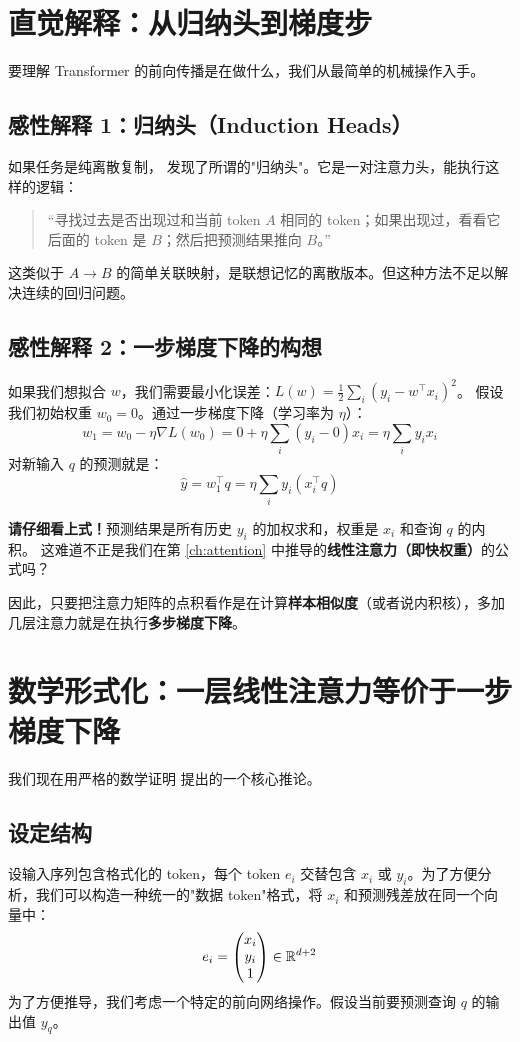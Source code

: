 \section{直觉解释：从归纳头到梯度步}
\label{sec:icl_intuition}

要理解 Transformer 的前向传播是在做什么，我们从最简单的机械操作入手。

\subsection{感性解释 1：归纳头（Induction Heads）}
如果任务是纯离散复制，\citet{olsson2022context} 发现了所谓的"归纳头"。它是一对注意力头，能执行这样的逻辑：
\begin{quote}
``寻找过去是否出现过和当前 token $A$ 相同的 token；如果出现过，看看它后面的 token 是 $B$；然后把预测结果推向 $B$。''
\end{quote}
这类似于 $A \to B$ 的简单关联映射，是联想记忆的离散版本。但这种方法不足以解决连续的回归问题。

\subsection{感性解释 2：一步梯度下降的构想}
如果我们想拟合 $w$，我们需要最小化误差：$L(w) = \frac{1}{2}\sum_i (y_i - w^\top x_i)^2$。
假设我们初始权重 $w_0 = 0$。通过一步梯度下降（学习率为 $\eta$）：
\[
  w_1 = w_0 - \eta \nabla L(w_0) = 0 + \eta \sum_i (y_i - 0) x_i = \eta \sum_i y_i x_i
\]
对新输入 $q$ 的预测就是：
\[
  \hat{y} = w_1^\top q = \eta \sum_i y_i (x_i^\top q)
\]

\textbf{请仔细看上式！}预测结果是所有历史 $y_i$ 的加权求和，权重是 $x_i$ 和查询 $q$ 的内积。
这难道不正是我们在第 \ref{ch:attention} 中推导的\textbf{线性注意力（即快权重）}的公式吗？

因此，只要把注意力矩阵的点积看作是在计算\textbf{样本相似度}（或者说内积核），多加几层注意力就是在执行\textbf{多步梯度下降}。

\section{数学形式化：一层线性注意力等价于一步梯度下降}
\label{sec:icl_math}

我们现在用严格的数学证明 \citet{von2022transformers} 提出的一个核心推论。

\subsection*{设定结构}
设输入序列包含格式化的 token，每个 token $e_i$ 交替包含 $x_i$ 或 $y_i$。为了方便分析，我们可以构造一种统一的"数据 token"格式，将 $x_i$ 和预测残差放在同一个向量中：
\[
  e_i = \begin{pmatrix} x_i \\ y_i \\ 1 \end{pmatrix} \in \mathbb{R}^{d+2}
\]
为了方便推导，我们考虑一个特定的前向网络操作。假设当前要预测查询 $q$ 的输出值 $y_q$。

